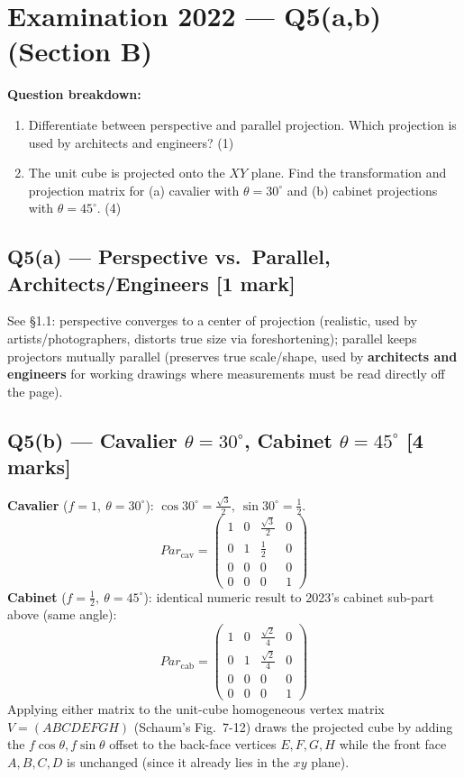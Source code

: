 \documentclass[12pt, a4paper]{article}
\newenvironment{solutionbox}{\begin{mdframed}[style=solutionframe]}{\end{mdframed}}
\newenvironment{answerbox}{\begin{mdframed}[style=answerframe]}{\end{mdframed}}
\begin{document}
\section{Examination 2022 --- Q5(a,b) (Section B)}
\begin{solutionbox}
\textbf{Question breakdown:}
\begin{enumerate}[noitemsep]
  \item[Q5(a)] Differentiate between perspective and parallel projection. Which projection is used by architects and engineers? (1)
  \item[Q5(b)] The unit cube is projected onto the $XY$ plane. Find the transformation and projection matrix for (a) cavalier with $\theta=30^\circ$ and (b) cabinet projections with $\theta=45^\circ$. (4)
\end{enumerate}
\end{solutionbox}

\subsection*{Q5(a) --- Perspective vs.\ Parallel, Architects/Engineers [1 mark]}
\begin{answerbox}
See \S1.1: perspective converges to a center of projection (realistic, used by artists/photographers, distorts true size via foreshortening); parallel keeps projectors mutually parallel (preserves true scale/shape, used by \textbf{architects and engineers} for working drawings where measurements must be read directly off the page).
\end{answerbox}

\subsection*{Q5(b) --- Cavalier $\theta=30^\circ$, Cabinet $\theta=45^\circ$ [4 marks]}
\begin{solutionbox}
\textbf{Cavalier} ($f=1,\ \theta=30^\circ$): $\cos30^\circ=\tfrac{\sqrt3}{2},\ \sin30^\circ=\tfrac12$.
$$Par_{\text{cav}} = \begin{pmatrix}1&0&\tfrac{\sqrt3}{2}&0\\0&1&\tfrac12&0\\0&0&0&0\\0&0&0&1\end{pmatrix}$$
\textbf{Cabinet} ($f=\tfrac12,\ \theta=45^\circ$): identical numeric result to 2023's cabinet sub-part above (same angle):
$$Par_{\text{cab}} = \begin{pmatrix}1&0&\tfrac{\sqrt2}{4}&0\\0&1&\tfrac{\sqrt2}{4}&0\\0&0&0&0\\0&0&0&1\end{pmatrix}$$
Applying either matrix to the unit-cube homogeneous vertex matrix $V=(ABCDEFGH)$ (Schaum's Fig.\ 7-12) draws the projected cube by adding the $f\cos\theta,f\sin\theta$ offset to the back-face vertices $E,F,G,H$ while the front face $A,B,C,D$ is unchanged (since it already lies in the $xy$ plane).
\end{solutionbox}
\end{document}
